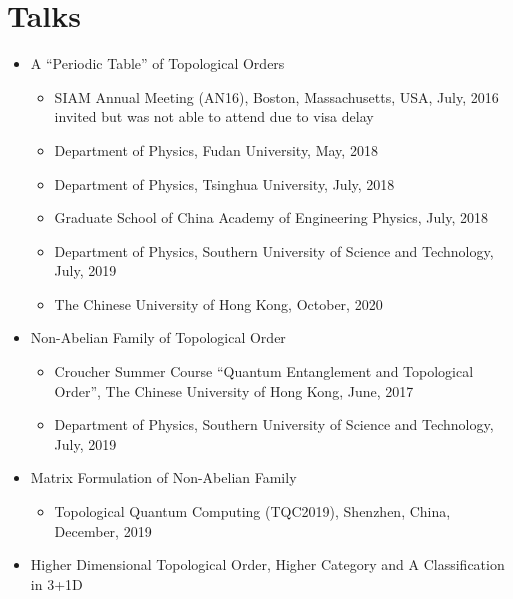 \documentclass[hidelinks,a4paper]{article}
\begin{document}
\section*{Talks}
\begin{itemize}
\item A ``Periodic Table'' of Topological Orders

  \begin{itemize}\small
    \item SIAM Annual Meeting (AN16), Boston, Massachusetts, USA, July, 2016 
    \\  {\tiny invited but was not able to attend due to visa delay}
    \item Department of Physics, Fudan University, May, 2018
    \item Department of Physics, Tsinghua University, July, 2018
    \item Graduate School of China Academy of Engineering Physics, July, 2018
    \item Department of Physics, Southern University of Science and Technology, July, 2019
    \item The Chinese University of Hong Kong, October, 2020
  \end{itemize}
  \item Non-Abelian Family of Topological Order~\supercite{LW1701.07820}

    \begin{itemize}\small
      \item Croucher Summer Course “Quantum Entanglement and Topological Order”,
	The Chinese University of Hong Kong, June, 2017
      \item 
	Department of Physics, Southern University of Science and Technology, July, 2019
  \end{itemize}
\item Matrix Formulation of Non-Abelian Family~\supercite{Lan1908.02599}
  \begin{itemize}\small
    \item Topological Quantum Computing (TQC2019), Shenzhen, China, December, 2019
  \end{itemize}
\item Higher Dimensional Topological Order, Higher Category and A Classification
  in 3+1D~\supercite{LKW1704.04221,LW1801.08530}


\end{itemize}
\end{document}
